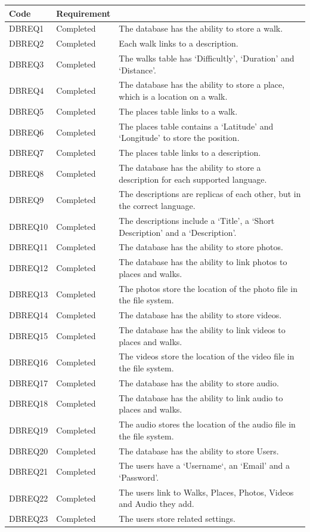 \documentclass[11pt,a4paper]{article}
\begin{document}
\begin{longtable}{ p{}|p{}|p{} }
\textbf{Code} & \textbf{Requirement} \\
\hline
DBREQ1 & Completed & The database has the ability to store a walk.\\ \hline
DBREQ2 & Completed & Each walk links to a description.  \\ \hline
DBREQ3 & Completed & The walks table has `Difficultly', `Duration' and `Distance'. \\ \hline
DBREQ4 & Completed & The database has the ability to store a place, which is a location on a walk.\\ \hline
DBREQ5 & Completed & The places table links to a walk.\\ \hline
DBREQ6 & Completed & The places table contains a `Latitude' and `Longitude' to store the position. \\ \hline
DBREQ7 & Completed & The places table links to a description. \\ \hline
DBREQ8 & Completed & The database has the ability to store a description for each supported language. \\ \hline
DBREQ9 & Completed & The descriptions are replicas of each other, but in the correct language. \\ \hline
DBREQ10 & Completed & The descriptions include a `Title', a `Short Description' and a `Description'.\\ \hline
DBREQ11 & Completed & The database has the ability to store photos. \\ \hline
DBREQ12 & Completed & The database has the ability to link photos to places and walks.\\ \hline
DBREQ13 & Completed & The photos store the location of the photo file in the file system.\\ \hline
DBREQ14 & Completed & The database has the ability to store videos. \\ \hline
DBREQ15 & Completed & The database has the ability to link videos to places and walks.\\ \hline
DBREQ16 & Completed & The videos store the location of the video file in the file system.\\ \hline
DBREQ17 & Completed & The database has the ability to store audio. \\ \hline
DBREQ18 & Completed & The database has the ability to link audio to places and walks.\\ \hline
DBREQ19 & Completed & The audio stores the location of the audio file in the file system.\\ \hline
DBREQ20 & Completed & The database has the ability to store Users. \\ \hline
DBREQ21 & Completed & The users have a `Username`, an `Email' and a `Password'.\\ \hline
DBREQ22 & Completed & The users link to Walks, Places, Photos, Videos and Audio they add. \\ \hline
DBREQ23 & Completed & The users store related settings. \\ \hline 

\end{longtable}
\end{document}

